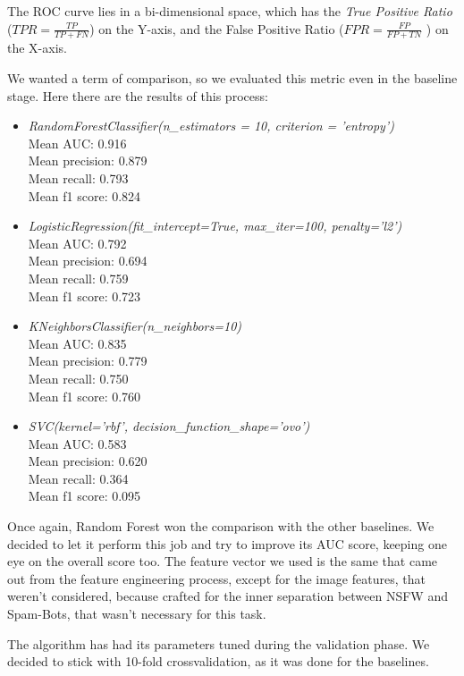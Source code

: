 The ROC curve lies in a bi-dimensional space, which has the \textit{True Positive Ratio} ($ TPR =  \frac{TP}{TP+FN}$) on the Y-axis, and the False Positive Ratio ($ FPR =  \frac{FP}{FP+TN}$ ) on the X-axis.

We wanted a term of comparison, so we evaluated this metric even in the baseline stage. Here there are the results of this process:
\begin{itemize}
	\item[\PencilRight] \textit{RandomForestClassifier(n\_estimators = 10, criterion = 'entropy')}\\
	Mean AUC: 0.916\\
	Mean precision: 0.879\\
	Mean recall: 0.793\\
	Mean f1 score: 0.824
	\item[\PencilRight]\textit{LogisticRegression(fit\_intercept=True, max\_iter=100, penalty='l2')}\\
	Mean AUC: 0.792\\
	Mean precision: 0.694\\
	Mean recall: 0.759\\
	Mean f1 score: 0.723
	\item[\PencilRight]\textit{KNeighborsClassifier(n\_neighbors=10)}\\
	Mean AUC: 0.835\\
	Mean precision: 0.779\\
	Mean recall: 0.750\\
	Mean f1 score: 0.760
	\item[\PencilRight]\textit{SVC(kernel='rbf', decision\_function\_shape='ovo')}\\
	Mean AUC: 0.583\\
	Mean precision: 0.620\\
	Mean recall: 0.364\\
	Mean f1 score: 0.095
\end{itemize}
Once again, Random Forest won the comparison with the other baselines.
We decided to let it perform this job and try to improve its AUC score, keeping one eye on the overall score too.
The feature vector we used is the same that came out from the feature engineering process\label{sec:feature_vector}, except for the image features, that weren't considered, because crafted for the inner separation between NSFW and Spam-Bots, that wasn't necessary for this task.

The algorithm has had its parameters tuned during the validation phase.
We decided to stick with 10-fold crossvalidation, as it was done for the baselines.

